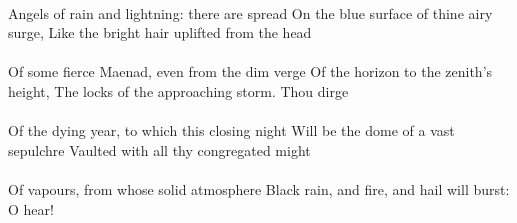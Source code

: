 \documentclass{doc}
\begin{document}
			\paragraph{}
				Angels of rain and lightning: there are spread
				On the blue surface of thine airy surge,
				Like the bright hair uplifted from the head
			\paragraph{}
				Of some fierce Maenad, even from the dim verge
				Of the horizon to the zenith’s height,
				The locks of the approaching storm. Thou dirge
			\paragraph{}
				Of the dying year, to which this closing night
				Will be the dome of a vast sepulchre
				Vaulted with all thy congregated might
			\paragraph{}
				Of vapours, from whose solid atmosphere
				Black rain, and fire, and hail will burst: O hear!
\end{document}

